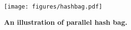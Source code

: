 \begin{figure}[h]
  \centering
  \texttt{[image: figures/hashbag.pdf]}
  \caption{\textbf{An illustration of parallel hash bag.}}\label{fig:hashbag}
\end{figure}